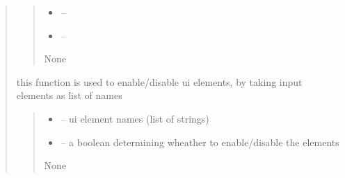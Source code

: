 \documentclass[letterpaper,10pt,english]{sphinxmanual}
\begin{document}
\begin{quote}
\begin{savenotes}
\begin{fulllineitems}
\begin{quote}
\begin{description}
\begin{itemize}
\item {} 
\sphinxAtStartPar
{} – 

\item {} 
\sphinxAtStartPar
{} – 

\end{itemize}

\sphinxAtStartPar
None

\end{description}\end{quote}

\end{fulllineitems}\end{savenotes}


\begin{savenotes}\begin{fulllineitems}
\label{\detokenize{setting/backend/user_login_logout_funcs:oxin.backend.user_login_logout_funcs.set_app_buttons_enable_or_disable}}
\pysigstartsignatures
{}
\pysigstopsignatures
\sphinxAtStartPar
this function is used to enable/disable ui elements, by taking input elements as list of names
\begin{quote}\begin{description}
\begin{itemize}
\item {} 
\sphinxAtStartPar
{} – ui element names (list of strings)

\item {} 
\sphinxAtStartPar
{} – a boolean determining wheather to enable/disable the elements

\end{itemize}

\sphinxAtStartPar
None

\end{description}\end{quote}


\end{fulllineitems}
\end{savenotes}
\end{quote}
\end{document}
